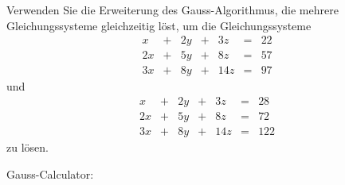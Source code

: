 Verwenden Sie die Erweiterung des Gauss-Algorithmus, die mehrere 
Gleichungssysteme gleichzeitig löst, um die Gleichungssysteme
\begin{equation}
\renewcommand\arraycolsep{2pt}
\begin{array}{rcrcrcr}
 x&+&2y&+& 3z&=&22\\
2x&+&5y&+& 8z&=&57\\
3x&+&8y&+&14z&=&97
\end{array}
\end{equation}
und
\begin{equation}
\renewcommand\arraycolsep{2pt}
\begin{array}{rcrcrcr}
 x&+&2y&+& 3z&=& 28\\
2x&+&5y&+& 8z&=& 72\\
3x&+&8y&+&14z&=&122
\end{array}
\end{equation}
zu lösen.

\begin{hinweis}
Gauss-Calculator: 
\end{hinweis}


